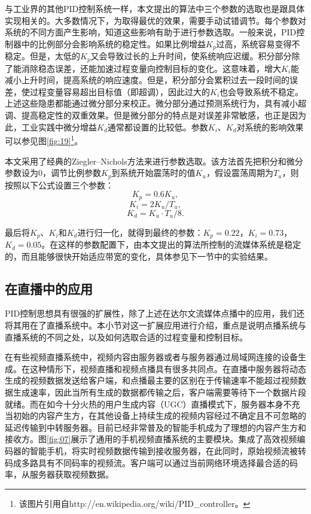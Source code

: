 与工业界的其他PID控制系统一样，本文提出的算法中三个参数的选取也是跟具体实现相关的。大多数情况下，为取得最优的效果，需要手动试错调节。每个参数对系统的不同方面产生影响，知道这些影响有助于进行参数选取。一般来说，PID控制器中的比例部分会影响系统的稳定性。如果比例增益$K_p$过高，系统容易变得不稳定。但是，太低的$K_p$又会导致过长的上升时间，使系统响应迟缓。积分部分除了能消除稳态误差，还能加速过程变量向控制目标的变化。这意味着，增大$K_i$能减小上升时间，提高系统的响应速度。但是，积分部分会累积过去一段时间的误差，使过程变量容易超出目标值（即超调），因此过大的$K_i$也会导致系统不稳定。上述这些隐患都能通过微分部分来校正。微分部分通过预测系统行为，具有减小超调、提高稳定性的双重效果。但是微分部分的特点是对误差非常敏感，也正是因为此，工业实践中微分增益$K_d$通常都设置的比较低。参数$K_i$、$K_d$对系统的影响效果可以参见图\ref{fig:19}\footnote{该图片引用自http://en.wikipedia.org/wiki/PID\_controller。}。

本文采用了经典的Ziegler--Nichols方法\supercite{Ziegler1942}来进行参数选取。该方法首先把积分和微分参数设为0，调节比例参数$K_p$到系统开始震荡时的值$K_u$，假设震荡周期为$T_u$，则按照以下公式设置三个参数：
\begin{equation}
K_p = 0.6K_u,
\end{equation}
\begin{equation}
K_i = 2K_u/T_u,
\end{equation}
\begin{equation}
K_d = K_u \cdot T_u/8.
\end{equation}

最后将$K_p$、$K_i$和$K_d$进行归一化，就得到最终的参数：$K_p = 0.22$，$K_i = 0.73$，$K_d = 0.05$。在这样的参数配置下，由本文提出的算法所控制的流媒体系统是稳定的，而且能够很快开始适应带宽的变化，具体参见下一节中的实验结果。

\subsection{在直播中的应用}

PID控制思想具有很强的扩展性，除了上述在达尔文流媒体点播中的应用，我们还将其用在了直播系统中。本小节对这一扩展应用进行介绍，重点是说明点播系统与直播系统的不同之处，以及如何选取合适的过程变量和控制目标。

在有些视频直播系统中，视频内容由服务器或者与服务器通过局域网连接的设备生成。在这种情形下，视频直播和视频点播具有很多共同点。在直播中服务器将动态生成的视频数据发送给客户端，和点播最主要的区别在于传输速率不能超过视频数据生成速率，因此当所有生成的数据都传输之后，客户端需要等待下一个数据片段就绪\supercite{Thang2014}。而在如今十分火热的用户生成内容（UGC）直播模式下，服务器本身不充当初始的内容产生方，在其他设备上持续生成的视频内容经过不确定且不可忽略的延迟传输到中转服务器。目前已经非常普及的智能手机成为了理想的内容产生方和接收方。图\ref{fig:07}展示了通用的手机视频直播系统的主要模块。集成了高效视频编码器的智能手机，将实时视频数据传输到接收服务器，在此同时，原始视频流被转码成多路具有不同码率的视频流。客户端可以通过当前网络环境选择最合适的码率，从服务器获取视频数据。

